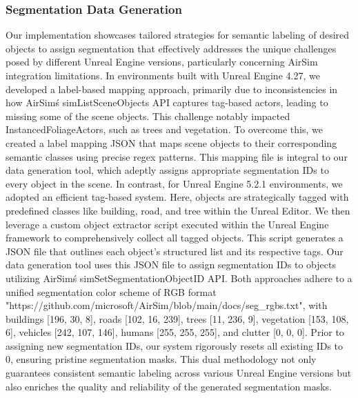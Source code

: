 \documentclass[../report.tex]{subfiles}
\begin{document}
    \subsubsection{Segmentation Data Generation}
     Our implementation showcases tailored strategies for semantic labeling of desired objects to assign segmentation that effectively addresses the unique challenges posed by different Unreal Engine versions, particularly concerning AirSim integration limitations. In environments built with Unreal Engine 4.27, we developed a label-based mapping approach, primarily due to inconsistencies in how AirSim\'s simListSceneObjects API captures tag-based actors, leading to missing some of the scene objects. This challenge notably impacted InstancedFoliageActors, such as trees and vegetation. To overcome this, we created a label mapping JSON that maps scene objects to their corresponding semantic classes using precise regex patterns. This mapping file is integral to our data generation tool, which adeptly assigns appropriate segmentation IDs to every object in the scene. In contrast, for Unreal Engine 5.2.1 environments, we adopted an efficient tag-based system. Here, objects are strategically tagged with predefined classes like building, road, and tree within the Unreal Editor. We then leverage a custom object extractor script executed within the Unreal Engine framework to comprehensively collect all tagged objects. This script generates a JSON file that outlines each object's structured list and its respective tags. Our data generation tool uses this JSON file to assign segmentation IDs to objects utilizing AirSim\'s simSetSegmentationObjectID API. Both approaches adhere to a unified segmentation color scheme of RGB format "https://github.com/microsoft/AirSim/blob/main/docs/seg_rgbs.txt", with buildings [196, 30, 8], roads [102, 16, 239], trees [11, 236, 9], vegetation [153, 108, 6], vehicles [242, 107, 146], humans [255, 255, 255], and clutter [0, 0, 0]. Prior to assigning new segmentation IDs, our system rigorously resets all existing IDs to 0, ensuring pristine segmentation masks. This dual methodology not only guarantees consistent semantic labeling across various Unreal Engine versions but also enriches the quality and reliability of the generated segmentation masks. 
\end{document}
